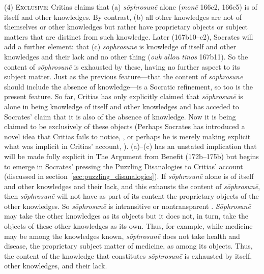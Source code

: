 (4) \textsc{Exclusive}: Critias claims that (a) \emph{sōphrosunē} alone (\emph{monē} 166c2, 166e5) is of itself and other knowledges. By contrast, (b) all other knowledges are not of themselves or other knowledges but rather have proprietary objects or subject matters that are distinct from such knowledge. Later (167b10–c2), Socrates will add a further element: that (c) \emph{sōphrosunē} is knowledge of itself and other knowledges and their lack and no other thing (\emph{ouk allou tinos} 167b11). So the content of \emph{sōphrosunē} is exhausted by these, having no further aspect to its subject matter. Just as the previous feature—that the content of \emph{sōphrosunē} should include the absence of knowledge—is a Socratic refinement, so too is the present feature. So far, Critias has only explicitly claimed that \emph{sōphrosunē} is alone in being knowledge of itself and other knowledges and has acceded to Socrates' claim that it is also of the absence of knowledge. Now it is being claimed to be exclusively of these objects (Perhaps Socrates has introduced a novel idea that Critias fails to notice, \citealt[37–8]{Duncombe:2020gi}, or perhaps he is merely making explicit what was implicit in Critias' account, \citealt[]{Tsouna:2022aa}). (a)–(c) has an unstated implication that will be made fully explicit in The Argument from Benefit (172b–175b) but begins to emerge in Socrates' pressing the Puzzling Disanalogies to Critias' account (discussed in section~\ref{sec:puzzling_disanalogies}). If \emph{sōphrosunē} alone is of itself and other knowledges and their lack, and this exhausts the content of \emph{sōphrosunē}, then \emph{sōphrosunē} will not have as part of its content the proprietary objects of the other knowledges. So \emph{sōphrosunē} is intransitive \citep{McCabe:2007ss} or nontransparent \citep[190]{Tsouna:2022aa}. \emph{Sōphrosunē} may take the other knowledges as its objects but it does not, in turn, take the objects of these other knowledges as its own. Thus, for example, while medicine may be among the knowledges known, \emph{sōphrosunē} does not take health and disease, the proprietary subject matter of medicine, as among its objects. Thus, the content of the knowledge that constitutes \emph{sōphrosunē} is exhausted by itself, other knowledges, and their lack.

